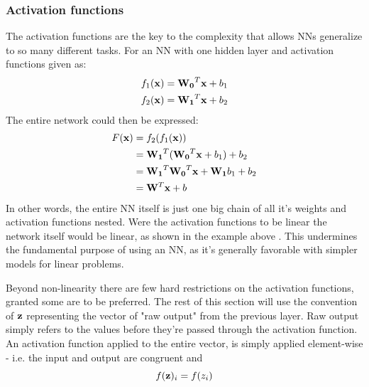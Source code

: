 \subsubsection{Activation functions}\label{sec:activation_func}

The activation functions are the key to the complexity that allows NNs generalize to so many different tasks. For an NN with one hidden layer and activation functions given as:
\begin{align}
\begin{split}
    f_1(\bold{x})&=\bold{W_0}^T\bold{x} + b_1 \\
    f_2(\bold{x})&=\bold{W_1}^T\bold{x} + b_2 
\end{split}
\end{align}
The entire network could then be expressed: 
\begin{align}\label{linear_nn}
    \begin{split}
        F(\bold{x})&=f_2(f_1(\bold{x})) \\
        &= \bold{W_1}^T(\bold{W_0}^T\bold{x} + b_1) + b_2 \\
        &= \bold{W_1}^T\bold{W_0}^T\bold{x}+\bold{W_1}b_1+b_2 \\
        &=\bold{W}^T\bold{x}+b
    \end{split}
\end{align}
In other words, the entire NN itself is just one big chain of all it's weights and activation functions nested. Were the activation functions to be linear the network itself would be linear, as shown in the example above \citep[p.168]{Goodfellow-et-al-2016}. This undermines the fundamental purpose of using an NN, as it's generally favorable with simpler models for linear problems. 

Beyond non-linearity there are few hard restrictions on the activation functions, granted some are to be preferred.
The rest of this section will use the convention of $\bold{z}$ representing the vector of "raw output" from the previous layer. Raw output simply refers to the values before they're passed through the activation function. An activation function applied to the entire vector, is simply applied element-wise - i.e. the input and output are congruent and
\begin{equation}
    f(\bold{z})_i = f(z_i)
\end{equation}

